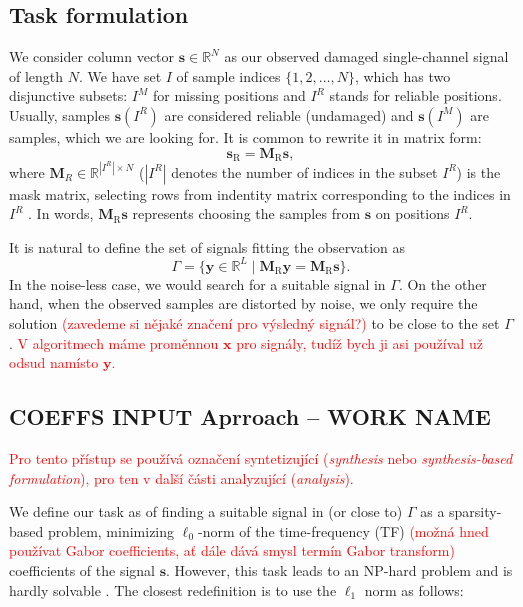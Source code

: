 \documentclass[conference]{IEEEtran}
\newcommand{\todo}[1]{\textcolor{red}{#1}}
\begin{document}
\subsection{Task formulation}

We consider column vector $ \mathbf{s} \in \mathbb{R}^{N} $ as our observed damaged single-channel signal of length $ N $.
We have set $ I $ of sample indices $ \{1,2,\dots,N\} $, which has two disjunctive subsets: $ I^M $ for missing positions and $ I^R $ stands for reliable positions.
Usually, samples $ \mathbf{s}(I^R) $ are considered reliable (undamaged) and $ \mathbf{s}(I^M) $ are samples, which we are looking for.
It is common to rewrite it in matrix form:
\begin{equation*}
	\mathbf{s}_{\mathrm{R}} = \mathbf{M}_{\mathrm{R}}\mathbf{s},
\end{equation*}
where $\mathbf{M}_{R} \in \mathbb{R} ^ { |I^R| \times N}$ ($ |I^R|$ denotes the number of indices in the subset $I^R$) is the mask matrix, selecting rows from indentity matrix corresponding to the indices in $I^R$ \cite{Adler2012}.
In words, $\mathbf{M}_{\mathrm{R}}\mathbf{s}$ represents choosing the samples from $\mathbf{s}$ on positions $I^R$.

It is natural to define the set of signals fitting the observation as
\begin{equation}
	\label{eq:Gamma}
	\Gamma = \lbrace \mathbf {y}\in \mathbb {R}^L\mid \mathbf{M}_{\mathrm{R}}\mathbf {y}=\mathbf{M}_{\mathrm{R}}\mathbf {s}\rbrace.
\end{equation}
In the noise-less case, we would search for a suitable signal in $\Gamma$.
On the other hand, when the observed samples are distorted by noise, we only require the solution \todo{(zavedeme si nějaké značení pro výsledný signál?)} to be close to the set $\Gamma$.
\todo{V algoritmech máme proměnnou $\mathbf{x}$ pro signály, tudíž bych ji asi používal už odsud namísto $\mathbf{y}$.}

\subsection{COEFFS INPUT Aprroach -- WORK NAME}\label{subsec:freqcoef}
\todo{Pro tento přístup se používá označení syntetizující (\textit{synthesis} nebo \textit{synthesis-based formulation}), pro ten v další části analyzující (\textit{analysis}).}

We define our task as of finding a suitable signal in (or close to) $\Gamma$ as a sparsity-based problem, minimizing $ \ell_0 $-norm of the time-frequency (TF) \todo{(možná hned používat Gabor coefficients, ať dále dává smysl termín Gabor transform)} coefficients of the signal $ \mathbf{s} $.
However, this task leads to an NP-hard problem and is hardly solvable \cite{Mokry2020}.
The closest redefinition is to use the $ \ell_1 $ norm as follows:
\end{document}
